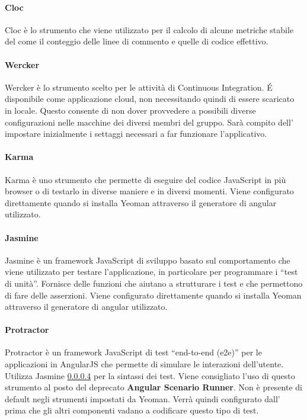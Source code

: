 			\paragraph{Cloc} %
			\label{par:cloc}
			Cloc è lo strumento che viene utilizzato per il calcolo di alcune metriche stabile del \docNameVersionPdQ{} come il conteggio delle linee di commento e quelle di codice effettivo.

			\paragraph{Wercker} %
			\label{par:wercker}
			Wercker è lo strumento scelto per le attività di Continuous Integration. \'E disponibile come applicazione cloud, non necessitando quindi di essere scaricato in locale. Questo consente di non dover provvedere a possibili diverse configurazioni nelle macchine dei diversi membri del gruppo. Sarà compito dell'\roleAdministrator{} impostare inizialmente i settaggi necessari a far funzionare l'applicativo.


			\paragraph{Karma} %
			\label{par:karmajs}
			Karma è uno strumento che permette di eseguire del codice JavaScript in più browser o di testarlo in diverse maniere e in diversi momenti. \newline
			Viene configurato direttamente quando si installa Yeoman attraverso il generatore di angular utilizzato.

			\paragraph{Jasmine} %
			\label{par:jasmine}
			Jasmine è un framework JavaScript di sviluppo basato sul comportamento che viene utilizzato per testare l'applicazione, in particolare per programmare i ``test di unità''. Fornisce delle funzioni che aiutano a strutturare i test e che permettono di fare delle asserzioni. \newline
			Viene configurato direttamente quando si installa Yeoman attraverso il generatore di angular utilizzato.

			\paragraph{Protractor} %
			\label{par:protractor}
			Protractor è un framework JavaScript di test ``end-to-end (e2e)'' per le applicazioni in AngularJS che permette di simulare le interazioni dell'utente. Utilizza Jasmine \ref{par:jasmine} per la sintassi dei test. Viene consigliato l'uso di questo strumento al posto del deprecato \textbf{Angular Scenario Runner}. \newline
			Non è presente di default negli strumenti impostati da Yeoman. Verrà quindi configurato dall'\roleAdministrator{} prima che gli altri componenti vadano a codificare questo tipo di test.


